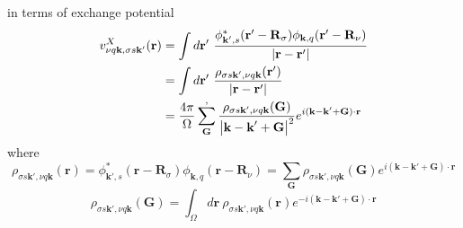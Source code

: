 \documentclass{article}
\begin{document}
            in terms of exchange potential
            \begin{align}
                v_{\nu q\textbf{k},\sigma s\textbf{k}'}^X(\textbf{r}) 
                &= \int d\textbf{r}'\ \frac{\phi_{\textbf{k}',s}^*(\textbf{r}'-\textbf{R}_{\sigma})\phi_{\textbf{k},q}(\textbf{r}'-\textbf{R}_{\nu})}{\left|\textbf{r}-\textbf{r}'\right|}\notag\\
                &= \int d\textbf{r}'\ \frac{\rho_{\sigma s\textbf{k}',\nu q\textbf{k}}(\textbf{r}')}{\left|\textbf{r}-\textbf{r}'\right|}\notag \\
                &= \frac{4\pi}{\Omega}\sum_{\textbf{G}}^{,}\frac{\rho_{\sigma s\textbf{k}',\nu q\textbf{k}}(\textbf{G})}{\left|\textbf{k}-\textbf{k}'+\textbf{G}\right|^2}e^{i(\textbf{k}-\textbf{k}'+\textbf{G})\cdot\textbf{r}}
            \end{align}
            where
            \begin{equation}
                \rho_{\sigma s\textbf{k}',\nu q\textbf{k}}(\textbf{r}) = \phi_{\textbf{k}',s}^*(\textbf{r}-\textbf{R}_{\sigma})\phi_{\textbf{k},q}(\textbf{r}-\textbf{R}_{\nu}) = \sum_{\textbf{G}}\rho_{\sigma s\textbf{k}',\nu q\textbf{k}}(\textbf{G})e^{i(\textbf{k}-\textbf{k}'+\textbf{G})\cdot\textbf{r}}
            \end{equation}
            \begin{equation}
                \rho_{\sigma s\textbf{k}',\nu q\textbf{k}}(\textbf{G}) = \int_{\Omega}d\textbf{r}\ \rho_{\sigma s\textbf{k}',\nu q\textbf{k}}(\textbf{r})e^{-i(\textbf{k}-\textbf{k}'+\textbf{G})\cdot\textbf{r}}
            \end{equation}

            
\end{document}
